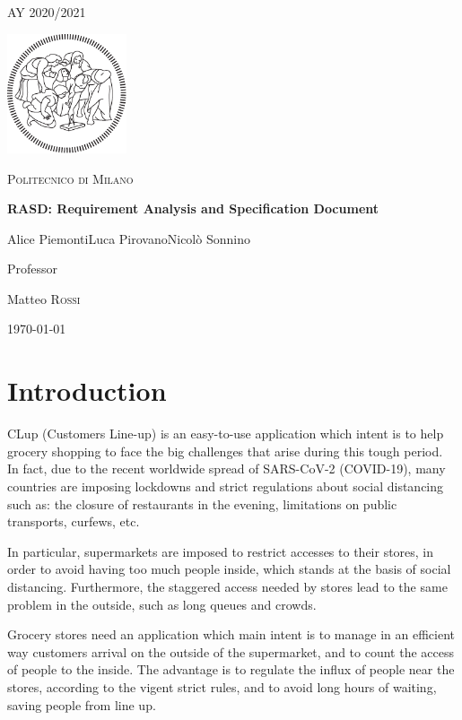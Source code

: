 \documentclass[12pt]{article}
\begin{document}
\begin{titlepage}
    \centering
    {\scshape\large AY 2020/2021 \par}
    \vfill
    \includegraphics[width=100pt]{assets/logo-polimi-new}\par\vspace{1cm}
    {\scshape\LARGE Politecnico di Milano \par}
    \vspace{1.5cm}
    {\huge\bfseries RASD\@: Requirement Analysis
        and Specification Document \par}
    \vspace{2cm}
    {\Large {Alice Piemonti\quad Luca Pirovano\quad Nicolò Sonnino}\par}
    \vfill
    {\large Professor\par
        Matteo \textsc{Rossi}}
    \vfill
    {\large \today \par}
\end{titlepage}
\tableofcontents
\newpage
\section{Introduction}
CLup (Customers Line-up) is an easy-to-use application which intent is to help grocery shopping to face the big challenges that arise during this tough period.\\

In fact, due to the recent worldwide spread of SARS-CoV-2 (COVID-19), many countries are imposing lockdowns and strict regulations about social distancing such as: the closure of restaurants in the evening, limitations on public transports, curfews, etc.

In particular, supermarkets are imposed to restrict accesses to their stores, in order to avoid having too much people inside, which stands at the basis of social distancing. Furthermore, the staggered access needed by stores lead to the same problem in the outside, such as long queues and crowds.

Grocery stores need an application which main intent is to manage in an efficient way customers arrival on the outside of the supermarket, and to count the access of people to the inside. The advantage is to regulate the influx of people near the stores, according to the vigent strict rules, and to avoid long hours of waiting, saving people from line up.
\end{document}
